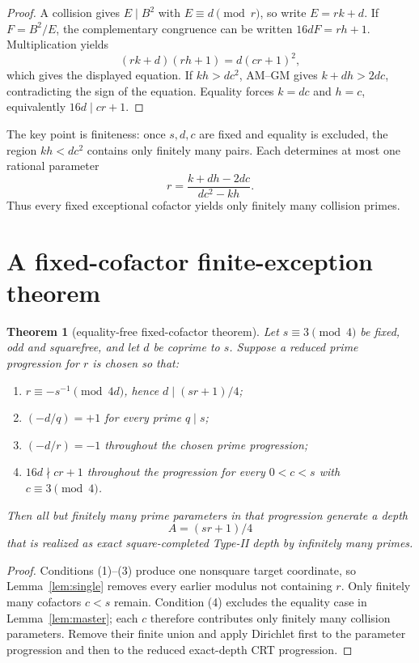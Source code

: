 \documentclass[11pt]{article}
\newtheorem{theorem}{Theorem}
\theoremstyle{definition}
\begin{document}
\begin{proof}
A collision gives $E\mid B^2$ with $E\equiv d\pmod r$, so write $E=rk+d$. If $F=B^2/E$, the complementary congruence can be written $16dF=rh+1$. Multiplication yields
\[
(rk+d)(rh+1)=d(cr+1)^2,
\]
which gives the displayed equation. If $kh>dc^2$, AM--GM gives $k+dh>2dc$, contradicting the sign of the equation. Equality forces $k=dc$ and $h=c$, equivalently $16d\mid cr+1$.
\end{proof}

The key point is finiteness: once $s,d,c$ are fixed and equality is excluded, the region $kh<dc^2$ contains only finitely many pairs. Each determines at most one rational parameter
\[
r=\frac{k+dh-2dc}{dc^2-kh}.
\]
Thus every fixed exceptional cofactor yields only finitely many collision primes.

\section{A fixed-cofactor finite-exception theorem}
\begin{theorem}[equality-free fixed-cofactor theorem]\label{thm:fixed}
Let $s\equiv3\pmod4$ be fixed, odd and squarefree, and let $d$ be coprime to $s$. Suppose a reduced prime progression for $r$ is chosen so that:
\begin{enumerate}
\item $r\equiv-s^{-1}\pmod{4d}$, hence $d\mid(sr+1)/4$;
\item $(-d/q)=+1$ for every prime $q\mid s$;
\item $(-d/r)=-1$ throughout the chosen prime progression;
\item $16d\nmid cr+1$ throughout the progression for every $0<c<s$ with $c\equiv3\pmod4$.
\end{enumerate}
Then all but finitely many prime parameters in that progression generate a depth
\[
\boxed{A=(sr+1)/4}
\]
that is realized as exact square-completed Type-II depth by infinitely many primes.
\end{theorem}

\begin{proof}
Conditions (1)--(3) produce one nonsquare target coordinate, so Lemma~\ref{lem:single} removes every earlier modulus not containing $r$. Only finitely many cofactors $c<s$ remain. Condition (4) excludes the equality case in Lemma~\ref{lem:master}; each $c$ therefore contributes only finitely many collision parameters. Remove their finite union and apply Dirichlet first to the parameter progression and then to the reduced exact-depth CRT progression.
\end{proof}
\end{document}
